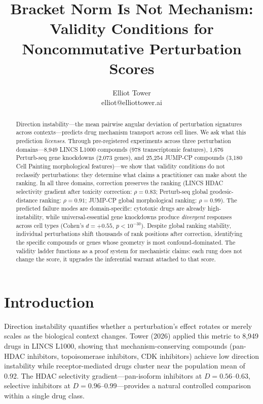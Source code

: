 \documentclass{article}
\title{Bracket Norm Is Not Mechanism:\\ Validity Conditions for Noncommutative Perturbation Scores}
\author{\name Elliot Tower \\
      \email elliot@elliottower.ai}
\begin{document}
\maketitle

\begin{abstract}
Direction instability---the mean pairwise angular deviation of perturbation
signatures across contexts---predicts drug mechanism transport across cell
lines. We ask what this prediction \emph{licenses}. Through pre-registered
experiments across three perturbation domains---8{,}949 LINCS L1000
compounds (978 transcriptomic features), 1{,}676 Perturb-seq gene
knockdowns \citep{replogle2022mapping} (2{,}073 genes), and 25{,}254
JUMP-CP compounds (3{,}180 Cell Painting morphological features)---we show
that validity conditions do not reclassify perturbations: they determine
what claims a practitioner can make about the ranking. In all three domains,
correction preserves the ranking (LINCS HDAC selectivity gradient after
toxicity correction: $\rho = 0.83$; Perturb-seq global geodesic-distance
ranking: $\rho = 0.91$; JUMP-CP global morphological ranking: $\rho =
0.99$). The predicted failure modes are domain-specific: cytotoxic drugs are
already high-instability, while universal-essential gene knockdowns produce
\emph{divergent} responses across cell types (Cohen's $d = +0.55$, $p <
10^{-30}$). Despite global ranking stability, individual perturbations shift
thousands of rank positions after correction, identifying the specific
compounds or genes whose geometry is most confound-dominated. The validity
ladder functions as a proof system for mechanistic claims: each rung does not
change the score, it upgrades the inferential warrant attached to that score.
\end{abstract}

\section{Introduction}

Direction instability quantifies whether a perturbation's effect rotates or
merely scales as the biological context changes. Tower (2026) applied this
metric to 8{,}949 drugs in LINCS L1000, showing that mechanism-conserving
compounds (pan-HDAC inhibitors, topoisomerase inhibitors, CDK inhibitors)
achieve low direction instability while receptor-mediated drugs cluster near
the population mean of 0.92. The HDAC selectivity gradient---pan-isoform
inhibitors at $D = 0.56$--$0.63$, selective inhibitors at $D = 0.96$--$0.99$---provides
a natural controlled comparison within a single drug class.
\end{document}

